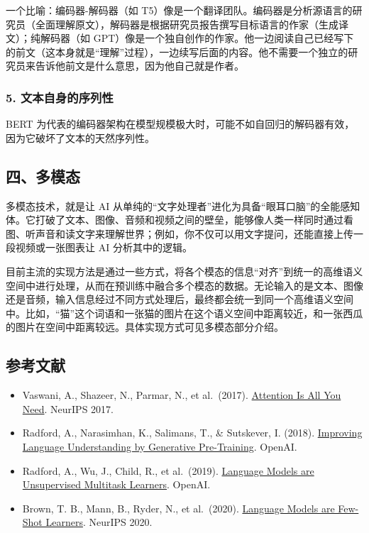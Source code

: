 一个比喻：编码器-解码器（如 T5）像是一个翻译团队。编码器是分析源语言的研究员（全面理解原文），解码器是根据研究员报告撰写目标语言的作家（生成译文）；纯解码器（如 GPT）像是一个独自创作的作家。他一边阅读自己已经写下的前文（这本身就是``理解''过程），一边续写后面的内容。他不需要一个独立的研究员来告诉他前文是什么意思，因为他自己就是作者。

\hypertarget{ux6587ux672cux81eaux8eabux7684ux5e8fux5217ux6027}{%
\subsubsection{5. 文本自身的序列性}\label{ux6587ux672cux81eaux8eabux7684ux5e8fux5217ux6027}}

BERT 为代表的编码器架构在模型规模极大时，可能不如自回归的解码器有效，因为它破坏了文本的天然序列性。

\hypertarget{ux56dbux591aux6a21ux6001}{%
\subsection{四、多模态}\label{ux56dbux591aux6a21ux6001}}

多模态技术，就是让 AI 从单纯的``文字处理者''进化为具备``眼耳口脑''的全能感知体。它打破了文本、图像、音频和视频之间的壁垒，能够像人类一样同时通过看图、听声音和读文字来理解世界；例如，你不仅可以用文字提问，还能直接上传一段视频或一张图表让 AI 分析其中的逻辑。

目前主流的实现方法是通过一些方式，将各个模态的信息``对齐''到统一的高维语义空间中进行处理，从而在预训练中融合多个模态的数据。无论输入的是文本、图像还是音频，输入信息经过不同方式处理后，最终都会统一到同一个高维语义空间中。比如，``猫''这个词语和一张猫的图片在这个语义空间中距离较近，和一张西瓜的图片在空间中距离较远。具体实现方式可见多模态部分介绍。

\hypertarget{ux53c2ux8003ux6587ux732e-71}{%
\subsection{参考文献}\label{ux53c2ux8003ux6587ux732e-71}}

\begin{itemize}
\tightlist
\item
  Vaswani, A., Shazeer, N., Parmar, N., et al.~(2017). \href{https://arxiv.org/abs/1706.03762}{Attention Is All You Need}. NeurIPS 2017.
\item
  Radford, A., Narasimhan, K., Salimans, T., \& Sutskever, I. (2018). \href{https://cdn.openai.com/research-covers/language-unsupervised/language_understanding_paper.pdf}{Improving Language Understanding by Generative Pre-Training}. OpenAI.
\item
  Radford, A., Wu, J., Child, R., et al.~(2019). \href{https://cdn.openai.com/better-language-models/language_models_are_unsupervised_multitask_learners.pdf}{Language Models are Unsupervised Multitask Learners}. OpenAI.
\item
  Brown, T. B., Mann, B., Ryder, N., et al.~(2020). \href{https://arxiv.org/abs/2005.14165}{Language Models are Few-Shot Learners}. NeurIPS 2020.
\end{itemize}


